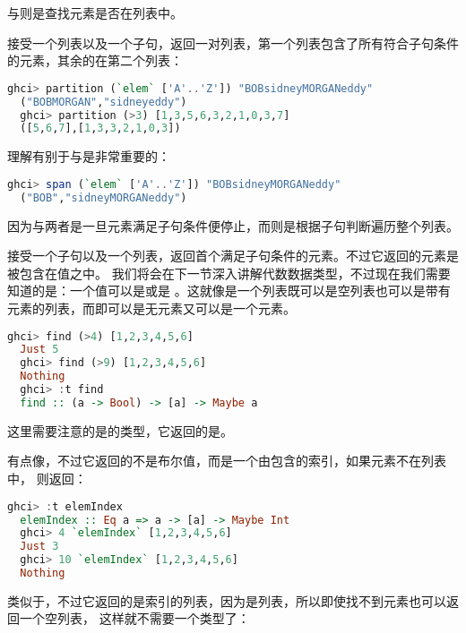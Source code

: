 \documentclass[./main.tex]{subfiles}
\begin{document}
与则是查找元素是否在列表中。

接受一个列表以及一个子句，返回一对列表，第一个列表包含了所有符合子句条件的元素，其余的在第二个列表：

\begin{lstlisting}[language=Haskell]
  ghci> partition (`elem` ['A'..'Z']) "BOBsidneyMORGANeddy"
  ("BOBMORGAN","sidneyeddy")
  ghci> partition (>3) [1,3,5,6,3,2,1,0,3,7]
  ([5,6,7],[1,3,3,2,1,0,3])
\end{lstlisting}

理解有别于与是非常重要的：

\begin{lstlisting}[language=Haskell]
  ghci> span (`elem` ['A'..'Z']) "BOBsidneyMORGANeddy"
  ("BOB","sidneyMORGANeddy")
\end{lstlisting}

因为与两者是一旦元素满足子句条件便停止，而则是根据子句判断遍历整个列表。

接受一个子句以及一个列表，返回首个满足子句条件的元素。不过它返回的元素是被包含在值之中。
我们将会在下一节深入讲解代数数据类型，不过现在我们需要知道的是：一个值可以是或是
。这就像是一个列表既可以是空列表也可以是带有元素的列表，而即可以是无元素又可以是一个元素。

\begin{lstlisting}[language=Haskell]
  ghci> find (>4) [1,2,3,4,5,6]
  Just 5
  ghci> find (>9) [1,2,3,4,5,6]
  Nothing
  ghci> :t find
  find :: (a -> Bool) -> [a] -> Maybe a
\end{lstlisting}

这里需要注意的是的类型，它返回的是。

有点像，不过它返回的不是布尔值，而是一个由包含的索引，如果元素不在列表中，
则返回：

\begin{lstlisting}[language=Haskell]
  ghci> :t elemIndex
  elemIndex :: Eq a => a -> [a] -> Maybe Int
  ghci> 4 `elemIndex` [1,2,3,4,5,6]
  Just 3
  ghci> 10 `elemIndex` [1,2,3,4,5,6]
  Nothing
\end{lstlisting}

类似于，不过它返回的是索引的列表，因为是列表，所以即使找不到元素也可以返回一个空列表，
这样就不需要一个类型了：
\end{document}
